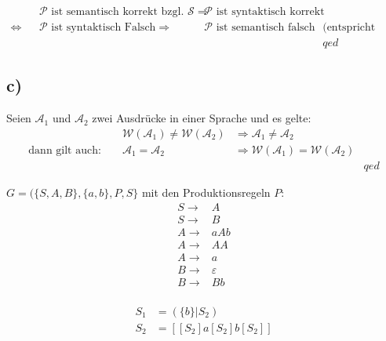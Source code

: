 \documentclass[a4paper,twoside]{homeworkassignment}
\begin{document}
\begin{align*}
&&\mathcal{P} \text{ ist semantisch korrekt bzgl. } \mathcal{S} \Rightarrow & \mathcal{P} \text{ ist syntaktisch korrekt}\\
\Leftrightarrow&&\mathcal{P} \text{ ist syntaktisch Falsch} \Rightarrow & \mathcal{P} \text{ ist semantisch falsch} & \text{(entspricht Def.)}\\
&&&&qed
\end{align*}
\subsection*{c)}
Seien $\mathcal{A}_1$ und $\mathcal{A}_2$ zwei Ausdrücke in einer Sprache und es gelte:
\begin{align*}
&&  \mathcal{W}(\mathcal{A}_1) \neq \mathcal{W}(\mathcal{A}_2) & \Rightarrow \mathcal{A}_1 \neq \mathcal{A}_2\\
\text{dann gilt auch: }&& \mathcal{A}_1 = \mathcal{A}_2 &  \Rightarrow \mathcal{W}(\mathcal{A}_1) = \mathcal{W}(\mathcal{A}_2) \\
&&&&qed 
\end{align*}

\newproblem[3] %

\newsubproblem
$G = (\{S,A,B\},\{a,b\},P,S\}$ mit den Produktionsregeln $P$:
\begin{align*}
  S \rightarrow & A \\
  S \rightarrow & B \\
  A \rightarrow & aAb\\
  A \rightarrow & AA\\
  A \rightarrow & a\\
  B \rightarrow & \varepsilon\\
  B \rightarrow & Bb\\
\end{align*}

\newsubproblem

\begin{align*}
S_1& = ( \{ b \} | S_2)\\
S_2& = [ [S_2] a [S_2] b [S_2] ]\\  
\end{align*}

\newpage
\newsubproblem
\end{document}
